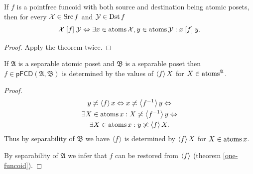 \begin{cor}
\label{pf-suprel-atoms}If $f$ is a pointfree funcoid with both source
and destination being atomic posets, then for every $\mathcal{X}\in\operatorname{Src} f$
and $\mathcal{Y}\in\operatorname{Dst} f$
\[
\mathcal{X}\mathrel{\left[f\right]}\mathcal{Y}\Leftrightarrow\exists x\in\operatorname{atoms}\mathcal{X},y\in\operatorname{atoms}\mathcal{Y}:x\mathrel{\left[f\right]}y.
\]
\end{cor}
\begin{proof}
Apply the theorem twice.\end{proof}
\begin{cor}
If $\mathfrak{A}$ is a separable atomic poset and $\mathfrak{B}$
is a separable poset then $f\in\mathsf{pFCD}(\mathfrak{A},\mathfrak{B})$
is determined by the values of $\left\langle f\right\rangle X$ for $X\in\operatorname{atoms}^{\mathfrak{A}}$.\end{cor}
\begin{proof}
~
\begin{multline*}
y\not\asymp\left\langle f\right\rangle x\Leftrightarrow x\not\asymp\left\langle f^{-1}\right\rangle y\Leftrightarrow\\
\exists X\in\operatorname{atoms} x:X\not\asymp\left\langle f^{-1}\right\rangle y\Leftrightarrow \\ \exists X\in\operatorname{atoms} x:y\not\asymp\left\langle f\right\rangle X.
\end{multline*}
Thus by separability of $\mathfrak{B}$ we have $\left\langle f\right\rangle$ is determined
by $\left\langle f\right\rangle X$ for $X\in\operatorname{atoms} x$.

By separability of $\mathfrak{A}$ we infer that $f$ can be restored
from $\left\langle f\right\rangle$ (theorem \ref{one-funcoid}).\end{proof}
